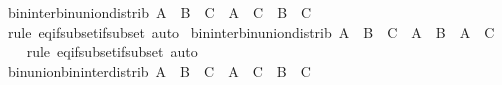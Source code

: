 \begin{isabellebody}
\endisatagproof
{\isafoldproof}%
%
\isadelimproof
\isanewline
%
\endisadelimproof
\isanewline
{}\isamarkupfalse%
\ bin{\isacharunderscore}{\kern0pt}inter{\isacharunderscore}{\kern0pt}bin{\isacharunderscore}{\kern0pt}union{\isacharunderscore}{\kern0pt}distrib{\isacharcolon}{\kern0pt}\ {\isachardoublequoteopen}{\isacharparenleft}{\kern0pt}A\ {\isasyminter}\ B{\isacharparenright}{\kern0pt}\ {\isasymunion}\ C\ {\isacharequal}{\kern0pt}\ {\isacharparenleft}{\kern0pt}A\ {\isasymunion}\ C{\isacharparenright}{\kern0pt}\ {\isasyminter}\ {\isacharparenleft}{\kern0pt}B\ {\isasymunion}\ C{\isacharparenright}{\kern0pt}{\isachardoublequoteclose}\isanewline
%
\isadelimproof
\ \ %
\endisadelimproof
%
\isatagproof
{}\isamarkupfalse%
\ {\isacharparenleft}{\kern0pt}rule\ eq{\isacharunderscore}{\kern0pt}if{\isacharunderscore}{\kern0pt}subset{\isacharunderscore}{\kern0pt}if{\isacharunderscore}{\kern0pt}subset{\isacharparenright}{\kern0pt}\ auto%
\endisatagproof
{\isafoldproof}%
%
\isadelimproof
\isanewline
%
\endisadelimproof
\isanewline
{}\isamarkupfalse%
\ bin{\isacharunderscore}{\kern0pt}inter{\isacharunderscore}{\kern0pt}bin{\isacharunderscore}{\kern0pt}union{\isacharunderscore}{\kern0pt}distrib{\isacharprime}{\kern0pt}{\isacharcolon}{\kern0pt}\ {\isachardoublequoteopen}A\ {\isasyminter}\ {\isacharparenleft}{\kern0pt}B\ {\isasymunion}\ C{\isacharparenright}{\kern0pt}\ {\isacharequal}{\kern0pt}\ {\isacharparenleft}{\kern0pt}A\ {\isasyminter}\ B{\isacharparenright}{\kern0pt}\ {\isasymunion}\ {\isacharparenleft}{\kern0pt}A\ {\isasyminter}\ C{\isacharparenright}{\kern0pt}{\isachardoublequoteclose}\isanewline
%
\isadelimproof
\ \ %
\endisadelimproof
%
\isatagproof
{}\isamarkupfalse%
\ {\isacharparenleft}{\kern0pt}rule\ eq{\isacharunderscore}{\kern0pt}if{\isacharunderscore}{\kern0pt}subset{\isacharunderscore}{\kern0pt}if{\isacharunderscore}{\kern0pt}subset{\isacharparenright}{\kern0pt}\ auto%
\endisatagproof
{\isafoldproof}%
%
\isadelimproof
\isanewline
%
\endisadelimproof
\isanewline
{}\isamarkupfalse%
\ bin{\isacharunderscore}{\kern0pt}union{\isacharunderscore}{\kern0pt}bin{\isacharunderscore}{\kern0pt}inter{\isacharunderscore}{\kern0pt}distrib{\isacharcolon}{\kern0pt}\ {\isachardoublequoteopen}{\isacharparenleft}{\kern0pt}A\ {\isasymunion}\ B{\isacharparenright}{\kern0pt}\ {\isasyminter}\ C\ {\isacharequal}{\kern0pt}\ {\isacharparenleft}{\kern0pt}A\ {\isasyminter}\ C{\isacharparenright}{\kern0pt}\ {\isasymunion}\ {\isacharparenleft}{\kern0pt}B\ {\isasyminter}\ C{\isacharparenright}{\kern0pt}{\isachardoublequoteclose}\isanewline

\end{isabellebody}
